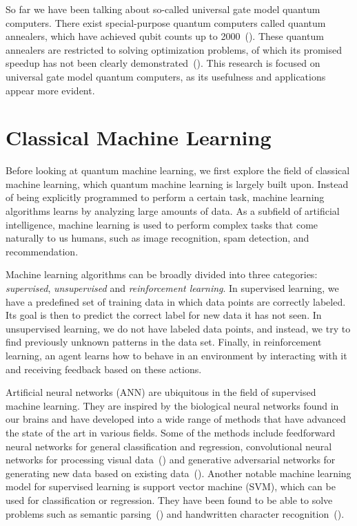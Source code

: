 \documentclass[a4paper,10pt]{article}
\begin{document}
So far we have been talking about so-called universal gate model quantum computers.
There exist special-purpose quantum computers called quantum annealers, which have achieved qubit counts up to 2000~(\cite{dwave-2000}).
These quantum annealers are restricted to solving optimization problems, of which its promised speedup has not been clearly demonstrated~(\cite{how-quantum-dwave, aaronson-dwave, detecting-quantum-speedup}).
This research is focused on universal gate model quantum computers, as its usefulness and applications appear more evident.

\section{Classical Machine Learning} \label{sec:classical-ml}
Before looking at quantum machine learning, we first explore the field of classical machine learning, which quantum machine learning is largely built upon.
Instead of being explicitly programmed to perform a certain task, machine learning algorithms learns by analyzing large amounts of data.
As a subfield of artificial intelligence, machine learning is used to perform complex tasks that come naturally to us humans, such as image recognition, spam detection, and recommendation.

Machine learning algorithms can be broadly divided into three categories: \emph{supervised}, \emph{unsupervised} and \emph{reinforcement learning}.
In supervised learning, we have a predefined set of training data in which data points are correctly labeled.
Its goal is then to predict the correct label for new data it has not seen.
In unsupervised learning, we do not have labeled data points, and instead, we try to find previously unknown patterns in the data set.
Finally, in reinforcement learning, an agent learns how to behave in an environment by interacting with it and receiving feedback based on these actions.

Artificial neural networks (ANN) are ubiquitous in the field of supervised machine learning.
They are inspired by the biological neural networks found in our brains and have developed into a wide range of methods that have advanced the state of the art in various fields.
Some of the methods include feedforward neural networks for general classification and regression, convolutional neural networks for processing visual data~(\cite{cirecsan2012multi}) and generative adversarial networks for generating new data based on existing data~(\cite{goodfellow2014generative}).
Another notable machine learning model for supervised learning is support vector machine (SVM), which can be used for classification or regression.
They have been found to be able to solve problems such as semantic parsing~(\cite{pradhan2004shallow}) and handwritten character recognition~(\cite{decoste2002training}).
\end{document}

